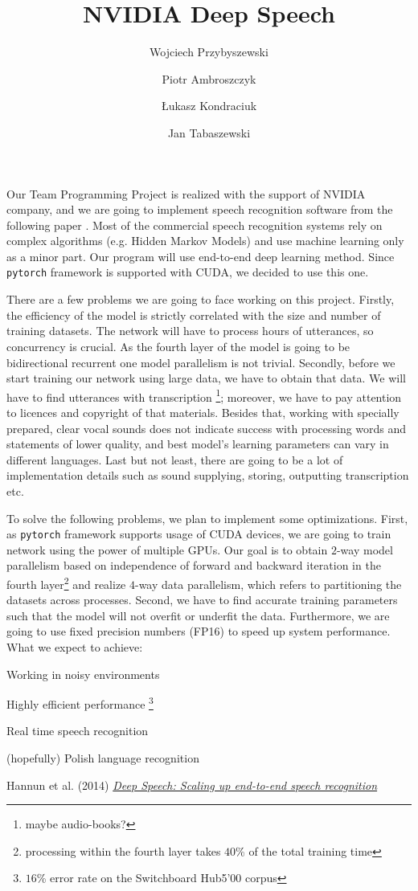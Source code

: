 \documentclass[11pt,a4paper]{article}
\title{NVIDIA Deep Speech}
\author{Wojciech Przybyszewski 
\and  Piotr Ambroszczyk 
\and Łukasz Kondraciuk 
\and Jan Tabaszewski}
\date{}
\begin{document}
\maketitle


Our Team Programming Project is realized with the support of NVIDIA company, and we are going to implement speech recognition software from the following paper \cite{paper}.
Most of the commercial speech recognition systems rely on complex algorithms (e.g. Hidden Markov Models) and use machine learning only as a minor part. Our program will use end-to-end deep learning method. Since \texttt{pytorch} framework is supported with CUDA, we decided to use this one.

There are a few problems we are going to face working on this project. Firstly, the efficiency of the model is strictly correlated with the size and number of training datasets. The network will have to process hours of utterances, so concurrency is crucial. As the fourth layer of the model is going to be bidirectional recurrent one model parallelism is not trivial. 
Secondly, before we start training our network using large data, we have to obtain that data. We will have to find utterances with transcription \footnote{maybe audio-books?}; moreover, we have to pay attention to licences and copyright of that materials.
Besides that, working with specially prepared, clear vocal sounds does not indicate success with processing words and statements of lower quality, and best model's learning parameters can vary in different languages.
Last but not least, there are going to be a lot of implementation details such as sound supplying, storing, outputting transcription etc.   

To solve the following problems, we plan to implement some optimizations. First, as \texttt{pytorch} framework supports usage of CUDA devices, we are going to train network using the power of multiple GPUs. Our goal is to obtain $2$-way model parallelism based on independence of forward and backward iteration in the fourth layer\footnote{processing within the fourth layer takes $40$\% of the total training time} and realize $4$-way data parallelism, which refers to partitioning the datasets across processes. Second, we have to find accurate training parameters such that the model will not overfit or underfit the data. Furthermore, we are going to use fixed precision numbers (FP16) to speed up system performance.
\\

\noindent
What we expect to achieve:
\begin{itemize}
\item Working in noisy environments
\item Highly efficient performance \footnote{$16$\% error rate on the Switchboard
Hub5’00 corpus}
\item Real time speech recognition
{\color{gray} \item  (hopefully) Polish language recognition} 
\end{itemize}

\begin{thebibliography}{1}
   Hannun et al. (2014) \href{https://arxiv.org/pdf/1412.5567.pdf}{\em Deep Speech: Scaling up end-to-end speech recognition} 

  \end{thebibliography}
  
\end{document}
